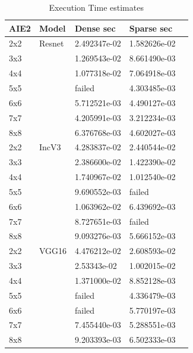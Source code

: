 \documentclass[conference]{IEEEtran}
\begin{document}
\begin{table}[htb]
  \caption{Execution Time estimates}
  \label{tab_perf}
\begin{center} 
\begin{tabular}{|l|l|l|l|l|}
  \hline
  AIE2 & Model  & Dense sec      & Sparse sec      \\ \hline\hline
  2x2   & Resnet & 2.492347e-02  & 1.582626e-02 \\ \hline
  3x3   &  & 1.269543e-02  & 8.661490e-03 \\ \hline
  4x4   &  &  1.077318e-02 & 7.064918e-03 \\ \hline
  5x5   &  &  failed       & 4.303485e-03 \\ \hline
  6x6   &  &  5.712521e-03 & 4.490127e-03 \\ \hline
  7x7   &  &  4.205991e-03 & 3.212234e-03 \\ \hline
  8x8   &  &  6.376768e-03 & 4.602027e-03 \\ \hline \hline
  2x2   & IncV3  & 4.283837e-02  & 2.440544e-02 \\ \hline
  3x3   &   & 2.386600e-02  & 1.422390e-02 \\ \hline
  4x4   &   &  1.740967e-02 & 1.012540e-02 \\ \hline
  5x5   &   &  9.690552e-03 & failed       \\ \hline
  6x6   &   &  1.063962e-02 & 6.439692e-03 \\ \hline
  7x7   &   &  8.727651e-03 & failed       \\ \hline
  8x8   &   &  9.093276e-03 & 5.666152e-03 \\ \hline \hline
  2x2   & VGG16  & 4.476212e-02  & 2.608593e-02 \\ \hline
  3x3   &   &  2.53343e-02  & 1.002015e-02 \\ \hline
  4x4   &   &  1.371000e-02 & 8.852128e-03 \\ \hline
  5x5   &   &  failed       & 4.336479e-03 \\ \hline
  6x6   &   &  failed       & 5.770197e-03 \\ \hline
  7x7   &   &  7.455440e-03 & 5.288551e-03 \\ \hline
  8x8   &   &  9.203393e-03 & 6.502333e-03 \\ \hline \hline
          
\end{tabular}
\end{center}
\end{table}
\end{document}
